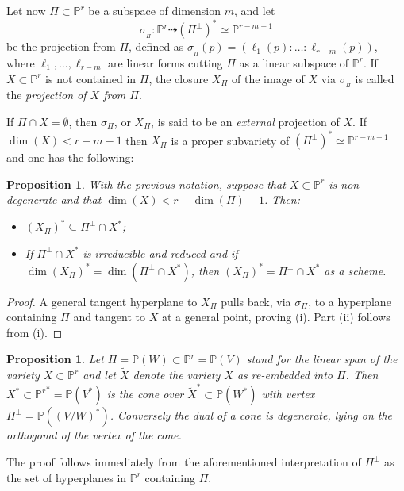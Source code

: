 \documentclass[11pt]{article}   %
\newtheorem{Proposition}[Theorem]{Proposition}
\theoremstyle{definition}
\numberwithin{Theorem}{section} \numberwithin{equation}{section}
\newcommand{\p}{{\mathbb P}}
\newcommand{\map}{\dasharrow}
\begin{document}
Let now $\Pi\subset \p^ r$ be a subspace of dimension $m$, and let
$$\sigma_{_\Pi}: \p^ r\map (\Pi^ \perp)^ *\simeq \p^ {r-m-1}$$
be the projection from $\Pi$, defined as
$\sigma_{_\Pi}(p)=(\ell_1(p):\ldots:\ell_{r-m}(p))$, where
$\ell_1,\ldots,\ell_{r-m}$ are linear forms cutting $\Pi$ as a
linear subspace of $\p^r$. If $X\subset \p^ r$ is not contained in
$\Pi$, the closure $X_\Pi$ of the image  of $X$ via $\sigma_{_\Pi}$
is called the {\it projection of $X$ from $\Pi$}.  { If $\Pi\cap X=\emptyset$, then
$\sigma_\Pi$, or  $X_\Pi$, is said to be an {\it external}
projection of $X$. If $\dim (X)<r-m-1$ then $X_\Pi$ is a proper
subvariety of $(\Pi^ \perp)^*\simeq \p^ {r-m-1}$ and one has the
following:

\begin{Proposition}\label{projection_compatibility}
 With the previous notation, suppose that $X\subset\p^r$ is
non-degen\-erate and that $\dim (X)<r-\dim(\Pi)-1$. Then:
\begin{itemize}
\item[{\rm (i)}] $(X_\Pi)^*\subseteq \Pi^\perp\cap X^*$;

\item[{\rm (ii)}] If $\Pi^\perp\cap X^*$ is irreducible and reduced and if $\dim(X_\Pi)^*=\dim(\Pi^\perp\cap X^*)$, then $(X_\Pi)^*=\Pi^\perp\cap X^*$ as a scheme.
\end{itemize}
\end{Proposition}

\begin{proof} A general tangent hyperplane to $X_\Pi$ pulls back, via $\sigma _\Pi$, to a
hyperplane containing $\Pi$ and tangent to $X$ at a general point, proving (i). Part (ii) follows from (i).
\end{proof}



\begin{Proposition}\label{cones}  Let $\Pi=\p(W)\subset \p^r=\p(V)$ stand for the linear
span of the variety $X\subset \p^r$ and let $\widetilde{X}$ denote
the variety $X$ as re-embedded into $\Pi$. Then  $X^*\subset
{\p^r}^*=\p(V^*)$ is the cone over $\widetilde{X}^*\subset \p(W^*)$
with vertex $\Pi^ \perp=\p((V/W)^*)$. Conversely the dual of a cone
is degenerate, lying {on}  the orthogonal of the vertex of
the cone.
\end{Proposition}

The proof follows immediately from the aforementioned
interpretation of $\Pi^{\perp}$ as the set of hyperplanes in $\p^r$
containing $\Pi$.



}
\end{document}
